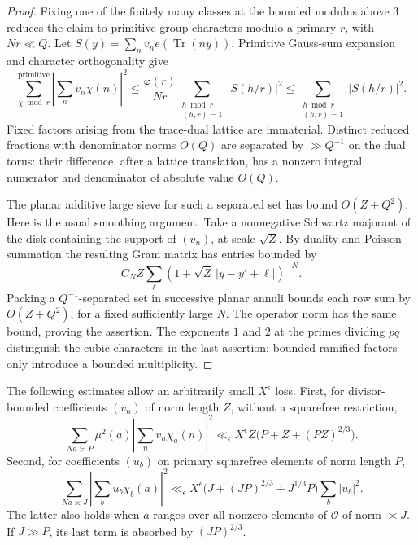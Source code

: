\begin{proof}
Fixing one of the finitely many classes at the bounded modulus above
$3$ reduces the claim to primitive group characters modulo a primary
$r$, with $Nr\ll Q$.
Let $S(y)=\sum_n v_n e(\operatorname{Tr}(ny))$.
Primitive Gauss-sum expansion and character orthogonality give
\[
 \sum_{\chi\bmod r}^{\mathrm{primitive}}
       \left|\sum_n v_n\chi(n)\right|^2
 \le \frac{\varphi(r)}{Nr}
       \sum_{\substack{h\bmod r\\(h,r)=1}}|S(h/r)|^2
 \le \sum_{\substack{h\bmod r\\(h,r)=1}}|S(h/r)|^2.
\]
Fixed factors arising from the trace-dual lattice are immaterial.
Distinct reduced fractions with denominator norms $O(Q)$ are separated
by $\gg Q^{-1}$ on the dual torus: their difference, after a lattice
translation, has a nonzero integral numerator and denominator of
absolute value $O(Q)$.

The planar additive large sieve for such a separated set has bound
$O(Z+Q^2)$. Here is the usual smoothing argument.
Take a nonnegative Schwartz majorant of the disk containing the support
of $(v_n)$, at scale $\sqrt Z$.
By duality and Poisson summation the resulting Gram matrix has entries
bounded by
\[
 C_N Z\sum_{\ell}(1+\sqrt Z\,|y-y'+\ell|)^{-N}.
\]
Packing a $Q^{-1}$-separated set in successive planar annuli bounds
each row sum by $O(Z+Q^2)$, for a fixed sufficiently large $N$.
The operator norm has the same bound, proving the assertion.
The exponents $1$ and $2$ at the primes dividing $pq$ distinguish the
cubic characters in the last assertion; bounded ramified factors only
introduce a bounded multiplicity.
\end{proof}

\begin{lemma}
\label{lem:cubic-extensions}
The following estimates allow an arbitrarily small $X^\epsilon$ loss.
First, for divisor-bounded coefficients $(v_n)$ of norm length $Z$,
without a squarefree restriction,
\begin{equation}
 \sum_{Na\asymp P}\mu^2(a)
       \left|\sum_n v_n\chi_a(n)\right|^2
 \ll_\epsilon X^\epsilon Z
       \bigl(P+Z+(PZ)^{2/3}\bigr).
 \label{eq:inner-extension}
\end{equation}
Second, for coefficients $(u_b)$ on primary squarefree elements of
norm length $P$,
\begin{equation}
 \sum_{Na\asymp J}\left|\sum_b u_b\chi_b(a)\right|^2
 \ll_\epsilon X^\epsilon
       \bigl(J+(JP)^{2/3}+J^{1/3}P\bigr)\sum_b|u_b|^2.
 \label{eq:outer-extension}
\end{equation}
The latter also holds when $a$ ranges over all nonzero elements of
$\mathcal O$ of norm $\asymp J$. If $J\gg P$, its last term is
absorbed by $(JP)^{2/3}$.
\end{lemma}

